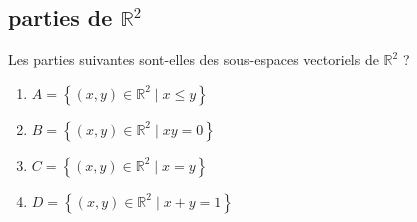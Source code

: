   \subsection{parties de $\mathbb{R}^2$}

    Les parties suivantes sont-elles des sous-espaces vectoriels de $\mathbb{R}^2$ ?
    \begin{enumerate}
      \item $A=\left\{(x, y) \in \mathbb{R}^2 \mid x \leqslant y\right\}$ 
      \item $B=\left\{(x, y) \in \mathbb{R}^2 \mid x y=0\right\}$ 
      \item $C=\left\{(x, y) \in \mathbb{R}^2 \mid x=y\right\}$ 
      \item $D=\left\{(x, y) \in \mathbb{R}^2 \mid x+y=1\right\}$
    \end{enumerate}
    
